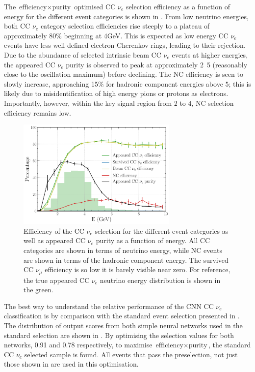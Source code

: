 The $\text{efficiency}\times\text{purity}$ optimised CC $\nu_{e}$ selection efficiency as a
function of energy for the different event categories is shown in
. From low neutrino energies, both CC $\nu_{e}$ category selection
efficiencies rise steeply to a plateau of approximately 80\% beginning at \unit{4}{GeV}. This is
expected as low energy CC $\nu_{e}$ events have less well-defined electron Cherenkov rings,
leading to their rejection. Due to the abundance of selected intrinsic beam CC $\nu_{e}$ events at
higher energies, the appeared CC $\nu_{e}$ purity is observed to peak at approximately
\unit{2.5}{\GeV} (reasonably close to the oscillation maximum) before declining. The NC efficiency
is seen to slowly increase, approaching 15\% for hadronic component energies above \unit{5}{\GeV};
this is likely due to misidentification of high energy pions or protons as electrons. Importantly,
however, within the key signal region from 2 to \unit{4}{\GeV}, NC selection efficiency remains
low.

\begin{figure} %
    \includegraphics[width=0.7\textwidth]{diagrams/7-results/final_nuel_hists.pdf}
    \caption[Efficiency of the CC $\nu_{e}$ selection as a function of energy]
    {Efficiency of the CC $\nu_{e}$ selection for the different event categories as well as
        appeared CC $\nu_{e}$ purity as a function of energy. All CC categories are shown in terms
        of neutrino energy, while NC events are shown in terms of the hadronic component energy.
        The survived CC $\nu_{\mu}$ efficiency is so low it is barely visible near zero. For
        reference, the true appeared CC $\nu_{e}$ neutrino energy distribution is shown in the
        green.}
    \label{fig:final_nuel_hists}
\end{figure}

The best way to understand the relative performance of the CNN CC $\nu_{e}$ classification is by
comparison with the standard event selection presented in . The
distribution of output scores from both simple neural networks used in the standard selection are
shown in . By optimising the selection values for both
networks, 0.91 and 0.78 respectively, to maximise $\text{efficiency}\times\text{purity}$, the
standard CC $\nu_{e}$ selected sample is found. All events that pass the preselection, not just
those shown in  are used in this optimisation.

